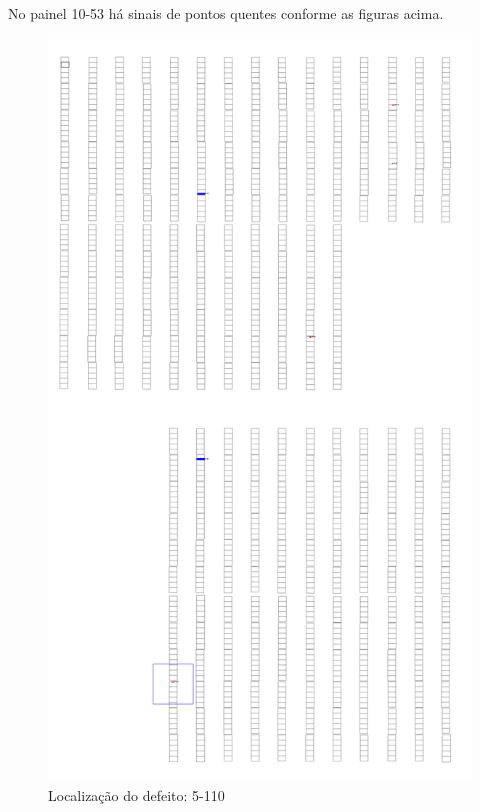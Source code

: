\documentclass[dvipsnames]{article}%
\begin{document}
%
\FloatBarrier%
No painel 10{-}53 há sinais de pontos quentes conforme as figuras acima.\newline%
%


\begin{figure}[h!]%
\begin{minipage}{0.31\linewidth}%
\centering%
\centering%
\includegraphics[width=\linewidth]{report_images/hotspots_5-110_map.jpg}%
\caption{Localização do defeito: 5-110}%
\end{minipage}%
\hfill%
\begin{minipage}{0.31\linewidth}%

\end{minipage}
\end{figure}
\end{document}
